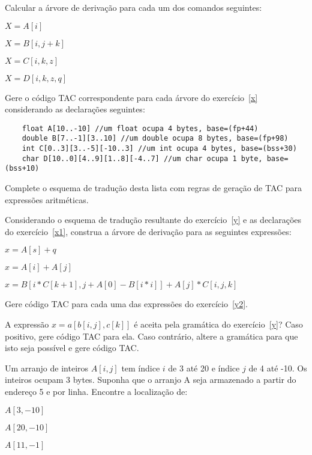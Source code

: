 \documentclass{compiladores}
\begin{document}
\begin{listanumerada}
\item \label{x} Calcular a árvore de derivação para cada um dos
  comandos seguintes:
  \begin{lista}
    \item $X = A[i]$
    \item $X = B[i, j+k]$
    \item $X = C[i, k, z]$
    \item $X = D[i, k, z, q]$
  \end{lista}

\item \label{x1} Gere o código TAC correspondente para cada árvore do
  exercício~\ref{x} considerando as declarações seguintes:
  \begin{lstlisting}
    float A[10..-10] //um float ocupa 4 bytes, base=(fp+44)
    double B[7..-1][3..10] //um double ocupa 8 bytes, base=(fp+98)
    int C[0..3][3..-5][-10..3] //um int ocupa 4 bytes, base=(bss+30)
    char D[10..0][4..9][1..8][-4..7] //um char ocupa 1 byte, base=(bss+10)
  \end{lstlisting}

\item \label{y} Complete o esquema de tradução desta lista com regras
  de geração de TAC para expressões aritméticas.

\item \label{y2} Considerando o esquema de tradução resultante do
  exercício~\ref{y} e as declarações do exercício~\ref{x1}, construa a
  árvore de derivação para as seguintes expressões:
  \begin{lista}
    \item $x = A[s] + q$
    \item $x = A[i] + A[j]$
    \item $x = B[i*C[k+1],j+A[0]-B[i*i]] + A[j] * C[i,j,k]$
  \end{lista}

\item Gere código TAC para cada uma das expressões do exercício~\ref{y2}.

\item A expressão $x = a[b[i,j],c[k]]$ é aceita pela gramática do
  exercício~\ref{y}? Caso positivo, gere código TAC para ela. Caso
  contrário, altere a gramática para que isto seja possível e gere
  código TAC.

\item \label{z} Um arranjo de inteiros $A[i,j]$ tem índice $i$ de 3 até 20 e
  índice $j$ de 4 até -10. Os inteiros ocupam 3 bytes. Suponha que o
  arranjo A seja armazenado a partir do endereço 5 e por
  linha. Encontre a localização de:
  \begin{lista}
    \item $A[3,-10]$
    \item $A[20,-10]$
    \item $A[11,-1]$
  \end{lista}


\end{listanumerada}
\end{document}
